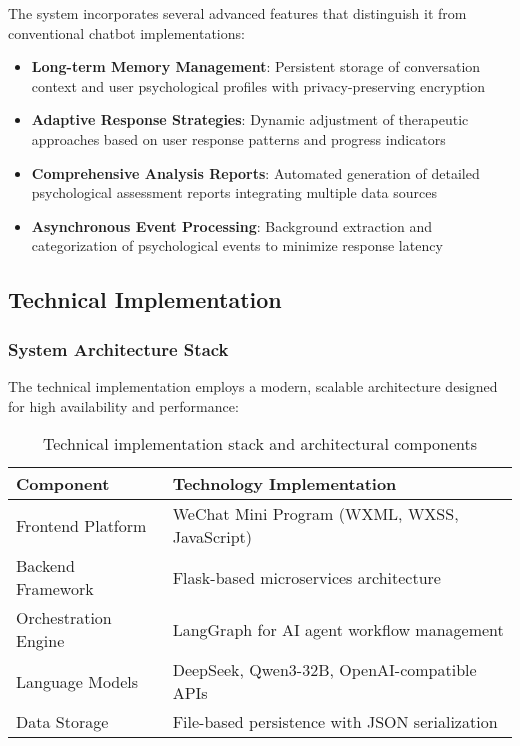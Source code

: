 The system incorporates several advanced features that distinguish it from conventional chatbot implementations:

\begin{itemize}
\item \textbf{Long-term Memory Management}: Persistent storage of conversation context and user psychological profiles with privacy-preserving encryption
\item \textbf{Adaptive Response Strategies}: Dynamic adjustment of therapeutic approaches based on user response patterns and progress indicators
\item \textbf{Comprehensive Analysis Reports}: Automated generation of detailed psychological assessment reports integrating multiple data sources
\item \textbf{Asynchronous Event Processing}: Background extraction and categorization of psychological events to minimize response latency
\end{itemize}

\subsection{Technical Implementation}

\subsubsection{System Architecture Stack}

The technical implementation employs a modern, scalable architecture designed for high availability and performance:

\begin{table}[h]
\centering
\begin{tabular}{|l|l|}
\hline
\textbf{Component} & \textbf{Technology Implementation} \\
\hline
Frontend Platform & WeChat Mini Program (WXML, WXSS, JavaScript) \\
\hline
Backend Framework & Flask-based microservices architecture \\
\hline
Orchestration Engine & LangGraph for AI agent workflow management \\
\hline
Language Models & DeepSeek, Qwen3-32B, OpenAI-compatible APIs \\
\hline
Data Storage & File-based persistence with JSON serialization \\
\hline
\end{tabular}
\caption{Technical implementation stack and architectural components}
\label{tab:technical_stack}
\end{table}


